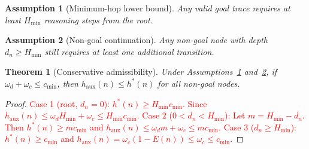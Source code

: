 \documentclass[11pt]{article}
\newtheorem{theorem}{Theorem}
\newtheorem{assumption}{Assumption}
\begin{document}
\begin{assumption}[Minimum-hop lower bound]
\label{ass:minhop}
Any valid goal trace requires at least $H_{\min}$ reasoning steps from the root.
\end{assumption}

\begin{assumption}[Non-goal continuation]
\label{ass:continue}
Any non-goal node with depth $d_n \geq H_{\min}$ still requires at least one additional transition.
\end{assumption}

\begin{theorem}[Conservative admissibility]
\label{thm:admissible}
Under Assumptions~\ref{ass:minhop} and~\ref{ass:continue}, if $\omega_d + \omega_c \leq c_{\min}$, then $h_{\text{aux}}(n) \leq h^*(n)$ for all non-goal nodes.
\end{theorem}

\begin{proof}
\textcolor{red}{Case 1 (root, $d_n=0$): $h^*(n) \geq H_{\min} c_{\min}$. Since $h_{\text{aux}}(n) \leq \omega_d H_{\min} + \omega_c \leq H_{\min} c_{\min}$.
Case 2 ($0 < d_n < H_{\min}$): Let $m = H_{\min}-d_n$. Then $h^*(n) \geq m c_{\min}$ and $h_{\text{aux}}(n) \leq \omega_d m + \omega_c \leq m c_{\min}$.
Case 3 ($d_n \geq H_{\min}$): $h^*(n) \geq c_{\min}$ and $h_{\text{aux}}(n) = \omega_c(1-E(n)) \leq \omega_c \leq c_{\min}$.}
\end{proof}









\end{document}
